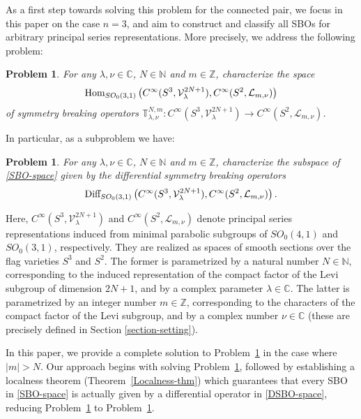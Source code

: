 \documentclass[12pt, pdflatex, a4paper]{article}
\theoremstyle{plain}
\newtheorem{prob}[thm]{Problem}
\theoremstyle{definition}
\def\C{{\mathbb C}}
\def\Diff{\text{\normalfont{Diff}}}
\def\Hom{\text{\normalfont{Hom}}}
\def\L{\mathcal{L}}
\def\N{{\mathbb N}}
\def\V{\mathcal{V}}
\def\Z{{\mathbb Z}}
\begin{document}
As a first step towards solving this problem for the connected pair, we focus in this paper on the case $n = 3$, and aim to construct and classify all SBOs for arbitrary principal series representations. More precisely, we address the following problem:

\begin{prob}\label{prob_SBO} For any $\lambda, \nu \in \C$, $N\in\N$ and $m \in \Z$, characterize the space
\begin{equation}\label{SBO-space}
\Hom_{SO_0(3,1)}\left(C^\infty(S^3, \V_\lambda^{2N+1}), C^\infty(S^2, \L_{m,\nu})\right)
\end{equation}
of symmetry breaking operators $\mathbb{T}_{\lambda, \nu}^{N, m}: C^\infty(S^3, \V_\lambda^{2N+1}) \rightarrow C^\infty(S^2, \L_{m,\nu})$.
\end{prob}
In particular, as a subproblem we have:

\begin{prob}\label{prob_DSBO} For any $\lambda, \nu \in \C$, $N\in\N$ and $m \in \Z$, characterize the subspace of \eqref{SBO-space} given by the differential symmetry breaking operators
\begin{equation}\label{DSBO-space}
\Diff_{SO_0(3,1)}\left(C^\infty(S^3, \V_\lambda^{2N+1}), C^\infty(S^2, \L_{m,\nu})\right).
\end{equation}
\end{prob}
Here, $C^\infty(S^3, \V_\lambda^{2N+1})$ and $C^\infty(S^2, \L_{m,\nu})$ denote principal series representations induced from minimal parabolic subgroups of $SO_0(4,1)$ and $SO_0(3,1)$,  respectively. They are realized as spaces of smooth sections over the flag varieties $S^3$ and $S^2$. The former is parametrized by a natural number $N \in \N$, corresponding to the induced representation of the compact factor of the Levi subgroup of dimension $2N+1$, and by a complex parameter $\lambda \in \C$. The latter is parametrized by an integer number $m \in \Z$, corresponding to the characters of the compact factor of the Levi subgroup, and by a complex number $\nu \in \C$ (these are precisely defined in Section \ref{section-setting}).

In this paper, we provide a complete solution to Problem~\ref{prob_SBO} in the case where $|m| > N$. Our approach begins with solving Problem~\ref{prob_DSBO}, followed by establishing a localness theorem (Theorem~\ref{Localness-thm}) which guarantees that every SBO in \eqref{SBO-space} is actually given by a differential operator in \eqref{DSBO-space}, reducing Problem~\ref{prob_SBO} to Problem~\ref{prob_DSBO}.
\end{document}
